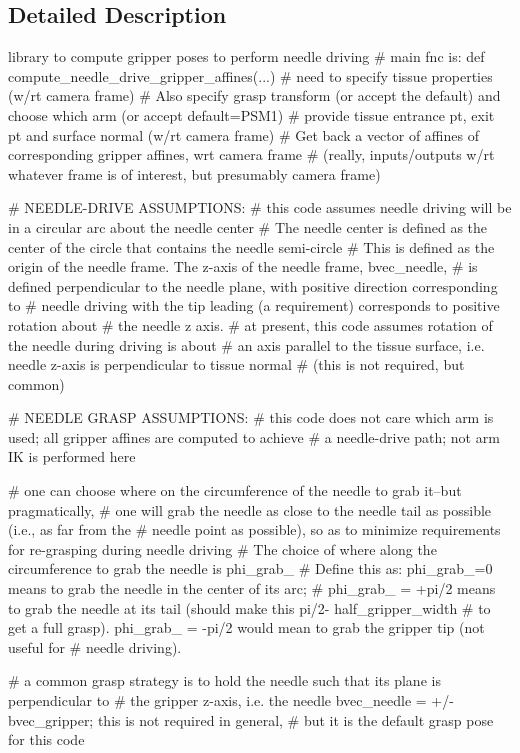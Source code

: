 \subsection{Detailed Description}
\begin{DoxyVerb}library to compute gripper poses to perform needle driving
# main fnc is: def compute_needle_drive_gripper_affines(...)
# need to specify tissue properties (w/rt camera frame)
# Also specify grasp transform (or accept the default) and choose which arm (or accept default=PSM1)
# provide tissue entrance pt, exit pt and surface normal (w/rt camera frame)
# Get back a vector of affines of corresponding gripper affines, wrt camera frame
# (really, inputs/outputs w/rt whatever frame is of interest, but presumably camera frame)


# NEEDLE-DRIVE ASSUMPTIONS:  
# this code assumes needle driving will be in a circular arc about the needle center
# The needle center is defined as the center of the circle that contains the needle semi-circle
#  This is defined as the origin of the needle frame. The z-axis of the needle frame, bvec_needle,
# is defined perpendicular to the needle plane, with positive direction corresponding to
# needle driving with the tip leading (a requirement) corresponds to positive rotation about
# the needle z axis.
# at present, this code assumes rotation of the needle during driving is about 
# an axis parallel to the tissue surface, i.e. needle z-axis is perpendicular to tissue normal
#  (this is not required, but common)

# NEEDLE GRASP ASSUMPTIONS:
# this code does not care which arm is used; all gripper affines are computed to achieve
# a needle-drive path; not arm IK is performed here

# one can choose where on the circumference of the needle to grab it--but pragmatically,
# one will grab the needle as close to the needle tail as possible (i.e., as far from the 
# needle point as possible), so as to minimize requirements for re-grasping during needle driving
# The choice of where along the circumference to grab the needle is phi_grab_
# Define this as: phi_grab_=0 means to grab the needle in the center of its arc;
# phi_grab_ = +pi/2 means to grab the needle at its tail (should make this pi/2- half_gripper_width
#   to get a full grasp).  phi_grab_ = -pi/2 would mean to grab the gripper tip (not useful for
#  needle driving).

# a common grasp strategy is to hold the needle such that its plane is perpendicular to
# the gripper z-axis, i.e. the needle bvec_needle = +/- bvec_gripper; this is not required in general,
# but it is the default grasp pose for this code


\end{DoxyVerb}
